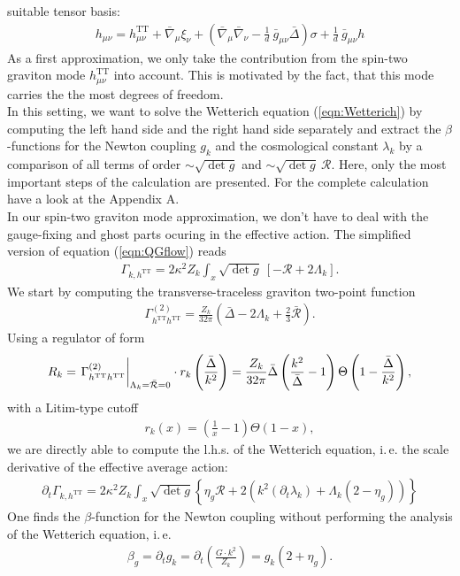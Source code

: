 suitable tensor basis:
\begin{align}
	h_{\mu\nu} = h_{\mu\nu}^{\text{TT}} + \bar{\nabla}_{\mu}\xi_{\nu} + \left(\bar{\nabla}_{\mu}\bar{\nabla}_{\nu} - \frac{1}{d} \ \bar{g}_{\mu\nu}\bar{\Delta}\right)\sigma + \frac{1}{d} \ \bar{g}_{\mu\nu}h
\end{align}
As a first approximation, we only take the contribution from the spin-two graviton mode $h_{\mu\nu}^{\text{TT}}$ into account. This is motivated by the fact, that this mode carries the the most degrees of freedom.\\ %
In this setting, we want to solve the Wetterich equation (\ref{eqn:Wetterich}) by computing the left hand side and the right hand side separately and extract the $\beta$-functions for the Newton coupling $g_k$ and the cosmological constant $\lambda_k$ by a comparison of all terms of order $\sim\sqrt{\operatorname{det}g}$ and $\sim \sqrt{\operatorname{det}g} \ \mathcal{R}$. Here, only the most important steps of the calculation are presented. For the complete calculation have a look at the Appendix A. \\%
In our spin-two graviton mode approximation, we don't have to deal with the gauge-fixing and ghost parts ocuring in the effective action. The simplified version of equation (\ref{eqn:QGflow}) reads
\begin{align}
	\Gamma_{k, h^{\text{TT}}} = 2\kappa^2Z_k \int_x \sqrt{\operatorname{det}g} \ [-\mathcal{R} + 2\Lambda_k].
\end{align}
We start by computing the transverse-traceless graviton two-point function
\begin{align}
\Gamma_{h^{\text{TT}}h^{\text{TT}}}^{(2)} = \frac{Z_k}{32\pi}\left(\bar{\Delta} - 2\Lambda_k+\frac{2}{3}\bar{\mathcal{R}}\right).
\end{align}
Using a regulator of form
\begin{align}
R_k  = \eval{\Gamma_{h^{\text{TT}}h^{\text{TT}}}^{(2)}}_{\Lambda_k=\bar{\mathcal{R}}=0} \cdot r_k\left(\frac{\bar{\Delta}}{k^2}\right) = \frac{Z_k}{32\pi}\bar{\Delta}\left(\frac{k^2}{\bar{\Delta}}-1\right)\Theta\left(1-\frac{\bar{\Delta}}{k^2}\right), \nonumber
\end{align}
with a Litim-type cutoff
\begin{align}
r_k(x) = \left(\frac{1}{x}-1\right)\Theta(1-x),
\end{align}
we are directly able to compute the l.h.s. of the Wetterich equation, i.\,e. the scale derivative of the effective average action:
\begin{align}
	\partial_{t}\Gamma_{k,h^{\text{TT}}} = 2\kappa^2 Z_k\int_x \sqrt{\operatorname{det}g} \left\{\eta_g\mathcal{R}+2\left(k^2(\partial_t\lambda_k) + \Lambda_k(2 - \eta_g)\right)\right\}
\end{align}
One finds the $\beta$-function for the Newton coupling without performing the analysis of the Wetterich equation, i.\,e. 
\begin{align}
\beta_g = \partial_t g_k = \partial_t\left(\frac{G\cdot k^2}{Z_k}\right) = g_k\left(2+\eta_g\right).
\end{align}

